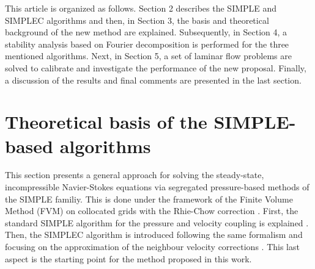 \documentclass[final,3p,times,11pt,onecolumn]{myElsarticle}
\numberwithin{equation}{section}
\begin{document}
This article is organized as follows. Section 2 describes the SIMPLE and SIMPLEC algorithms and then, in Section 3, the basis and theoretical background of the new method are explained. Subsequently, in Section 4, a stability analysis based on Fourier decomposition is performed for the three mentioned algorithms. Next, in Section 5, a set of laminar flow problems are solved to calibrate and investigate the performance of the new proposal. Finally, a discussion of the results and final comments are presented in the last section.

\section{Theoretical basis of the SIMPLE-based algorithms} \label{sec:theory}

This section presents a general approach for solving the steady-state, incompressible Navier-Stokes equations via segregated pressure-based methods of the SIMPLE familiy. This is done under the framework of the Finite Volume Method (FVM) on collocated grids with the Rhie-Chow correction \cite{rhiechow}. First, the standard SIMPLE algorithm for the pressure and velocity coupling is explained \cite{patankar1972}. Then, the SIMPLEC algorithm is introduced \cite{vanDoormal} following the same formalism and focusing on the approximation of the neighbour velocity corrections \cite{moukalled}. This last aspect is the starting point for the method proposed in this work.
\end{document}
